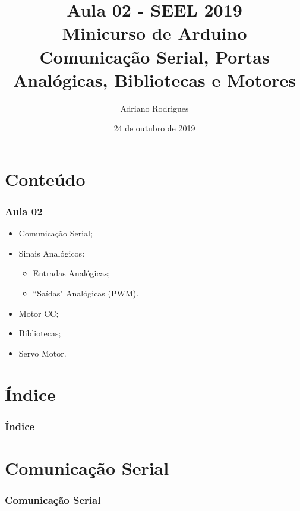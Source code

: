 \documentclass{beamer}
\title[Serial, P. Analógicas, Bibliotecas e Motores]{Aula 02 - SEEL 2019 \\Minicurso de Arduino \\Comunicação Serial, Portas Analógicas, Bibliotecas e Motores}
\author[Adriano]{Adriano Rodrigues}
\date{24 de outubro de 2019}
\begin{document}
\begin{frame}
	\titlepage
\end{frame}

\section{Conteúdo}
\begin{frame}
\frametitle{Aula 02}
	\begin{itemize}
		\item Comunicação Serial;
		\item Sinais Analógicos:
		\begin{itemize}
			\item Entradas Analógicas;
			\item ``Saídas" Analógicas (PWM).
		\end{itemize}
		\item Motor CC;
		\item Bibliotecas;
		\item Servo Motor.
	\end{itemize}
\end{frame}

\section{Índice}
\begin{frame}
\frametitle{Índice}
\begin{multicols}{2}
\tableofcontents
\end{multicols}
\end{frame}

\section{Comunicação Serial}
\begin{frame}[fragile]
	\frametitle{Comunicação Serial}
	\begin{center}
	\end{center}
\end{frame}
\end{document}
